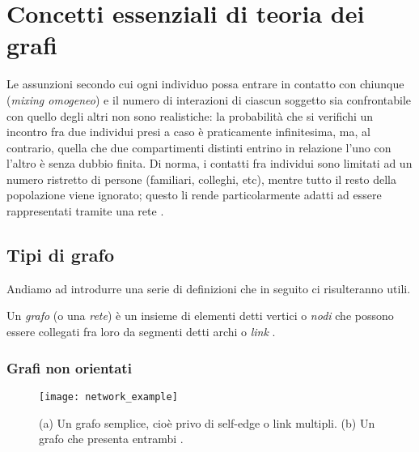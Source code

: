\chapter{Concetti essenziali di teoria dei grafi}
\label{chap:cap2}

Le assunzioni secondo cui ogni individuo possa entrare in contatto con chiunque (\emph{mixing omogeneo}) e il numero di interazioni di ciascun soggetto sia confrontabile con quello degli altri non sono realistiche: la probabilità che si verifichi un incontro fra due individui presi a caso è praticamente infinitesima, ma, al contrario, quella che due compartimenti distinti entrino in relazione l'uno con l'altro è senza dubbio finita. Di norma, i contatti fra individui sono limitati ad un numero ristretto di persone (familiari, colleghi, etc), mentre tutto il resto della popolazione viene ignorato; questo li rende particolarmente adatti ad essere rappresentati tramite una rete \cite{Barabasi}. 
\section{Tipi di grafo}
Andiamo ad introdurre una serie di definizioni che in seguito ci risulteranno utili.
\begin{definizione}
Un \emph{grafo} (o una \emph{rete}) è un insieme di elementi detti vertici o \emph{nodi} che possono essere collegati fra loro da segmenti detti archi o \emph{link} \cite{Bickle}.
\end{definizione}
\subsection{Grafi non orientati}
\begin{figure}
		\begin{center}
			\texttt{[image: network\_example]}
			\caption{(a) Un grafo semplice, cioè privo di self-edge o link multipli. (b) Un grafo che presenta entrambi \cite{Newman}.}
			\label{fig:net_ex}
		\end{center}
	\end{figure}
	
